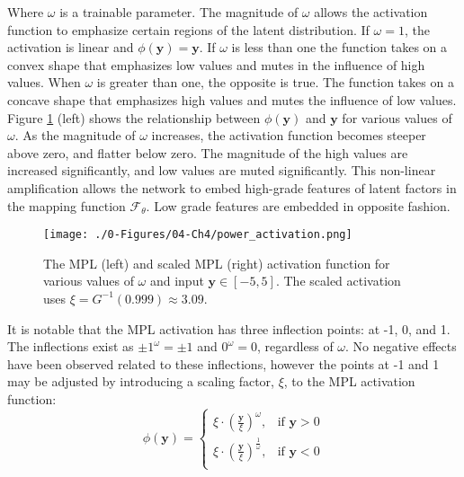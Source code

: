Where $\omega$ is a trainable parameter. The magnitude of $\omega$ allows the activation function to emphasize certain regions of the latent distribution. If $\omega = 1$, the activation is linear and $\phi \left( \mathbf{y} \right)=\mathbf{y}$. If $\omega$ is less than one the function takes on a convex shape that emphasizes low values and mutes in the influence of high values. When $\omega$ is greater than one, the opposite is true. The function takes on a concave shape that emphasizes high values and mutes the influence of low values. Figure \ref{fig:power_activation} (left) shows the relationship between $\phi \left( \mathbf{y} \right)$ and $\mathbf{y}$ for various values of $\omega$. As the magnitude of $\omega$ increases, the activation function becomes steeper above zero, and flatter below zero. The magnitude of the high values are increased significantly, and low values are muted significantly. This non-linear amplification allows the network to embed high-grade features of latent factors in the mapping function $\mathcal{F}_{\theta}$. Low grade features are embedded in opposite fashion.

\begin{figure}[htb!]
    \centering
    \texttt{[image: ./0-Figures/04-Ch4/power\_activation.png]}
    \caption{The \gls{MPL} (left) and scaled \gls{MPL} (right) activation function for various values of $\omega$ and input $\mathbf{y} \in [-5,5]$. The scaled activation uses $\xi = G^{-1}(0.999) \approx 3.09$. }
    \label{fig:power_activation}
\end{figure}

It is notable that the \gls{MPL} activation has three inflection points: at -1, 0, and 1. The inflections exist as $\pm 1^{\omega} = \pm 1$ and $0^{\omega} = 0$, regardless of $\omega$. No negative effects have been observed related to these inflections, however the points at -1 and 1 may be adjusted by introducing a scaling factor, $\xi$, to the \gls{MPL} activation function:
\begin{equation}
    \phi \left( \mathbf{y} \right) =
    \begin{cases}
        \xi \cdot \left(\frac{\mathbf{y}}{\xi}\right)^{\omega},           & \text{if $\mathbf{y} > 0$} \\
        \xi \cdot \left(\frac{\mathbf{y}}{\xi}\right)^{\frac{1}{\omega}}, & \text{if $\mathbf{y} < 0$} \\
    \end{cases}
    \label{eq:power_scale}
\end{equation}

